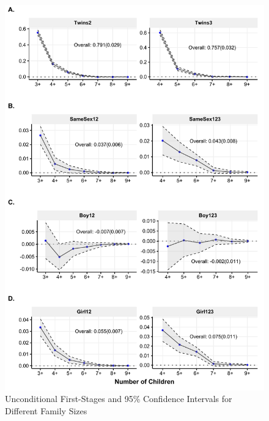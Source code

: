 \documentclass[11pt,a4paper]{article}
\begin{document}
\begin{figure}[ht]
\centering
\caption{\label{fig:02}Unconditional First-Stages and 95\% Confidence Intervals for Different Family Sizes}
\includegraphics[width=\textwidth]{figures/acrs.pdf}
\end{figure}

\end{document}
